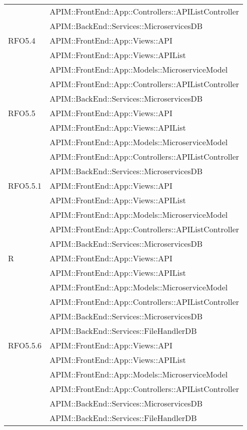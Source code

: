 \begin{longtable}{ p{4cm} | p{12cm} }
	& APIM::FrontEnd::App::Controllers::APIListController \\
	& APIM::BackEnd::Services::MicroservicesDB \\
	\hline		
	RFO5.4
	& APIM::FrontEnd::App::Views::API \\
	& APIM::FrontEnd::App::Views::APIList \\
	& APIM::FrontEnd::App::Models::MicroserviceModel \\
	& APIM::FrontEnd::App::Controllers::APIListController \\
	& APIM::BackEnd::Services::MicroservicesDB \\
	\hline		
	RFO5.5
	& APIM::FrontEnd::App::Views::API \\
	& APIM::FrontEnd::App::Views::APIList \\
	& APIM::FrontEnd::App::Models::MicroserviceModel \\
	& APIM::FrontEnd::App::Controllers::APIListController \\
	& APIM::BackEnd::Services::MicroservicesDB \\
	\hline		
	RFO5.5.1
	& APIM::FrontEnd::App::Views::API \\
	& APIM::FrontEnd::App::Views::APIList \\
	& APIM::FrontEnd::App::Models::MicroserviceModel \\
	& APIM::FrontEnd::App::Controllers::APIListController \\
	& APIM::BackEnd::Services::MicroservicesDB \\
	\hline		
	R
	& APIM::FrontEnd::App::Views::API \\
	& APIM::FrontEnd::App::Views::APIList \\
	& APIM::FrontEnd::App::Models::MicroserviceModel \\
	& APIM::FrontEnd::App::Controllers::APIListController \\
	& APIM::BackEnd::Services::MicroservicesDB \\
	& APIM::BackEnd::Services::FileHandlerDB \\
	\hline		
	RFO5.5.6
	& APIM::FrontEnd::App::Views::API \\
	& APIM::FrontEnd::App::Views::APIList \\
	& APIM::FrontEnd::App::Models::MicroserviceModel \\
	& APIM::FrontEnd::App::Controllers::APIListController \\
	& APIM::BackEnd::Services::MicroservicesDB \\
	& APIM::BackEnd::Services::FileHandlerDB \\

\end{longtable}
